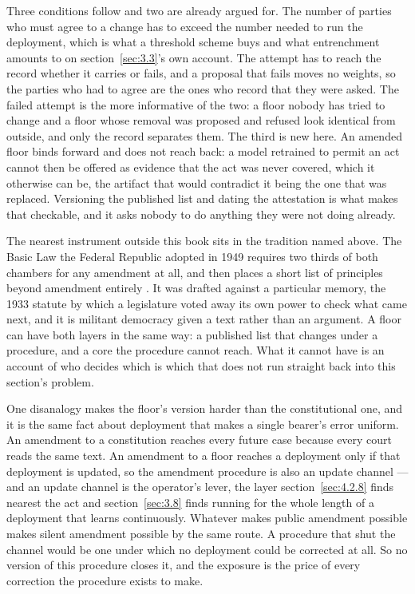 Three conditions follow and two are already argued for. The number of parties who must agree to a change has to exceed the number needed to run the deployment, which is what a threshold scheme buys and what entrenchment amounts to on section~\ref{sec:3.3}'s own account. The attempt has to reach the record whether it carries or fails, and a proposal that fails moves no weights, so the parties who had to agree are the ones who record that they were asked. The failed attempt is the more informative of the two: a floor nobody has tried to change and a floor whose removal was proposed and refused look identical from outside, and only the record separates them. The third is new here. An amended floor binds forward and does not reach back: a model retrained to permit an act cannot then be offered as evidence that the act was never covered, which it otherwise can be, the artifact that would contradict it being the one that was replaced. Versioning the published list and dating the attestation is what makes that checkable, and it asks nobody to do anything they were not doing already.

The nearest instrument outside this book sits in the tradition named above. The Basic Law the Federal Republic adopted in 1949 requires two thirds of both chambers for any amendment at all, and then places a short list of principles beyond amendment entirely \autocite{germany1949basiclaw}. It was drafted against a particular memory, the 1933 statute by which a legislature voted away its own power to check what came next, and it is militant democracy given a text rather than an argument. A floor can have both layers in the same way: a published list that changes under a procedure, and a core the procedure cannot reach. What it cannot have is an account of who decides which is which that does not run straight back into this section's problem.

One disanalogy makes the floor's version harder than the constitutional one, and it is the same fact about deployment that makes a single bearer's error uniform. An amendment to a constitution reaches every future case because every court reads the same text. An amendment to a floor reaches a deployment only if that deployment is updated, so the amendment procedure is also an update channel — and an update channel is the operator's lever, the layer section~\ref{sec:4.2.8} finds nearest the act and section~\ref{sec:3.8} finds running for the whole length of a deployment that learns continuously. Whatever makes public amendment possible makes silent amendment possible by the same route. A procedure that shut the channel would be one under which no deployment could be corrected at all. So no version of this procedure closes it, and the exposure is the price of every correction the procedure exists to make.

